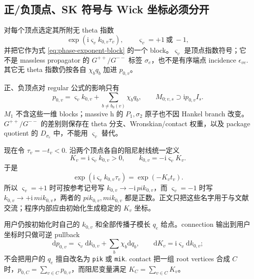 \documentclass[11pt,a4paper]{ctexart}
\newcommand{\dd}{\mathrm d}
\newcommand{\ii}{\mathrm i}
\begin{document}
\subsection{正/负顶点、SK 符号与 Wick 坐标必须分开}

对每个顶点选定其所附无 theta 指数
\begin{equation}
 \exp(\ii\varsigma_vk_{0,v}\tau_v),
 \qquad \varsigma_v=+1\ \text{或}\ -1,
 \label{eq:vertex-phase-sign}
\end{equation}
并把它作为式 \eqref{eq:phase-exponent-block} 的一个 block。$\varsigma_v$ 是顶点指数符号；它不是 massless propagator 的 $G^{++}/G^{--}$ 标签 $\sigma_e$，也不是有序端点 incidence $\epsilon_{ve}$. 其它无 theta 指数仍按各自 $\chi_bq_b$ 加进 $p_{0,v}$。

正、负顶点对 regular 公式的影响只有
\begin{equation}
 p_{0,v}=\varsigma_vk_{0,v}+\sum_{b\neq b_0(v)}\chi_bq_b,
 \qquad
 M_{0;v,s}\supset\ii p_{0,v}I_s.
 \label{eq:signed-vertex-M0}
\end{equation}
$M_1$ 不含这些一维 blocks；massive h 的 $P_1,\sigma_2$ 原子也不因 Hankel branch 改变。$G^{++}/G^{--}$ 的差别则保存在 theta 分支、Wronskian/contact 权重，以及 package quotient 的 $D_{\sigma_e}$ 中，不能用 $\varsigma_v$ 替代。

现在令 $\tau_v=-t_v<0$. 沿两个顶点各自的阻尼射线统一定义
\begin{equation}
 K_v=\ii\varsigma_vk_{0,v}>0,
 \qquad
 k_{0,v}=-\ii\varsigma_vK_v.
 \label{eq:unified-vertex-wick-coordinate}
\end{equation}
于是
\begin{equation}
 \exp(\ii\varsigma_vk_{0,v}\tau_v)=\exp(-K_vt_v).
\end{equation}
所以 $\varsigma_v=+1$ 时可按参考记号写 $k_{0,v}\to-\ii\,pik_{0,v}$，而 $\varsigma_v=-1$ 时写 $k_{0,v}\to+\ii\,mik_{0,v}$，两者的 $pik_{0,v},mik_{0,v}$ 都是正数。正文只把这些名字用于与文献交流；程序内部应由初始化生成稳定的 $K_v$ 坐标。

用户仍按初始化时自己的 $k_{0,v}$ 和全部传播子模长 $q_e$ 给点。connection 输出到用户坐标时只做可逆 pullback
\begin{equation}
 \dd p_{0,v}=\varsigma_v\dd k_{0,v}+\sum_b\chi_b\dd q_b,
 \qquad
 \dd K_v=\ii\varsigma_v\dd k_{0,v};
 \label{eq:user-to-internal-coordinate-pullback}
\end{equation}
不会把用户的 $q_e$ 擅自改名为 \texttt{pik} 或 \texttt{mik}. contact 把一组 root vertices 合成 $C$ 时，$p_{0,C}=\sum_{v\in C}p_{0,v}$，而阻尼变量满足 $K_C=\sum_{v\in C}K_v$。
\end{document}
